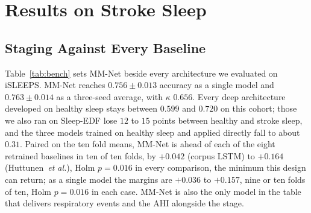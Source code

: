 \documentclass{ieeeaccess}
\newcommand{\mmAcc}{0.763}
\newcommand{\mmAccS}{0.756}
\newcommand{\mmK}{0.656}
\begin{document}
\section{Results on Stroke Sleep}
\label{sec:results}

\subsection{Staging Against Every Baseline}
Table~\ref{tab:bench} sets MM-Net beside every architecture we evaluated on iSLEEPS. MM-Net
reaches $\mmAccS\pm0.013$ accuracy as a single model and $\mmAcc\pm0.014$ as a three-seed
average, with $\kappa$ $\mmK$. Every deep architecture developed on healthy sleep stays between
$0.599$ and $0.720$ on this cohort; those we also ran on Sleep-EDF lose $12$ to $15$ points
between healthy and stroke sleep, and the
three models trained on healthy sleep and applied directly fall to about $0.31$. Paired on the ten
fold means, MM-Net is ahead of each of the eight retrained baselines in ten of ten folds, by
$+0.042$ (corpus LSTM) to $+0.164$ (Huttunen~\textit{et al.}), Holm $p=0.016$ in every
comparison, the minimum this design can return; as a single model the margins are $+0.036$ to
$+0.157$, nine or ten folds of ten, Holm $p=0.016$ in each case. MM-Net is also the only model in
the table that delivers respiratory events and the AHI alongside the stage.
\end{document}
